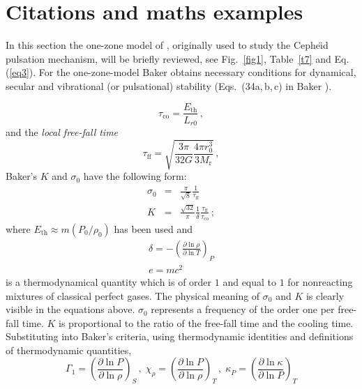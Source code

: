 \documentclass{aa}
\begin{document}
\section{Citations and maths examples}

   In this section the one-zone model of \citet{baker},
   originally used to study the Cephe{\"{\i}}d pulsation mechanism, will
   be briefly reviewed, see Fig.~\ref{fig1}, Table~\ref{t7} and Eq. (\ref{eq3}).
   For the one-zone-model Baker obtains necessary conditions
   for dynamical, secular and vibrational (or pulsational)
   stability (Eqs.\ (34a,\,b,\,c) in Baker \citeyear{baker}).
   
   \begin{equation}
    \label{eq1}
      \tau_{\mathrm{co}} = \frac{E_{\mathrm{th}}}{L_{r0}} \,,
   \end{equation}
   and the \emph{local free-fall time}
   \begin{equation}
      \tau_{\mathrm{ff}} =
         \sqrt{ \frac{3 \pi}{32 G} \frac{4\pi r_0^3}{3 M_{\mathrm{r}}}
}\,,
   \end{equation}
   Baker's $K$ and $\sigma_0$ have the following form:
   \begin{eqnarray}
   \label{eq3}
      \sigma_0 & = & \frac{\pi}{\sqrt{8}}
                     \frac{1}{ \tau_{\mathrm{ff}}} \\
      K        & = & \frac{\sqrt{32}}{\pi} \frac{1}{\delta}
                        \frac{ \tau_{\mathrm{ff}} }
                             { \tau_{\mathrm{co}} }\,;
   \end{eqnarray}
   where $ E_{\mathrm{th}} \approx m (P_0/{\rho_0})$ has been used and
   \begin{equation}
   \begin{array}{l}
      \delta = - \left(
                    \frac{ \partial \ln \rho }{ \partial \ln T }
                 \right)_P \\
      e=mc^2
   \end{array}
   \end{equation}
   is a thermodynamical quantity which is of order $1$ and equal to $1$
   for nonreacting mixtures of classical perfect gases. The physical
   meaning of $ \sigma_0 $ and $K$ is clearly visible in the equations
   above. $\sigma_0$ represents a frequency of the order one per
   free-fall time. $K$ is proportional to the ratio of the free-fall
   time and the cooling time. Substituting into Baker's criteria, using
   thermodynamic identities and definitions of thermodynamic quantities,
   \begin{displaymath}
      \Gamma_1      = \left( \frac{ \partial \ln P}{ \partial\ln \rho}
                           \right)_{S}    \, , \;
      \chi^{}_\rho  = \left( \frac{ \partial \ln P}{ \partial\ln \rho}
                           \right)_{T}    \, , \;
      \kappa^{}_{P} = \left( \frac{ \partial \ln \kappa}{ \partial\ln P}
                           \right)_{T}
   \end{displaymath}
\end{document}
